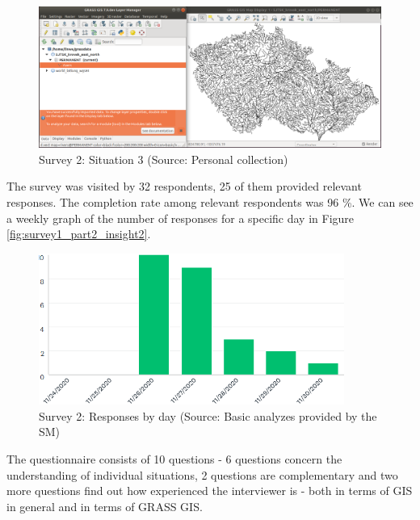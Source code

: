 \documentclass[a4paper,10pt,twoside]{article}
\begin{document}
\vspace{0.3cm}
\begin{figure}[hbt!] 
\begin{center}
\includegraphics[width=17cm]{../pictures/grass_infobar_3.png} 
\caption[Survey 2: Situation 3]{Survey 2: Situation 3 (Source: Personal collection)}
\label{fig:grass_infobar_3}
\end{center}
\end{figure}

\noindent The survey was visited by 32 respondents, 25 of them
provided relevant responses. The completion rate among relevant
respondents was 96 \%. We can see a weekly graph of the number of
responses for a specific day in Figure
\ref{fig:survey1_part2_insight2}.

\vspace{0.3cm}
\begin{figure}[hbt!] 
\begin{center}
\includegraphics[width=10cm]{../surveys/analyzed_data/survey2_insight2.png} 
\caption[Survey 2: Responses by day]{Survey 2: Responses by day (Source: Basic analyzes provided by the SM)}
\label{fig:survey2_insight2}
\end{center}
\end{figure}

\noindent The questionnaire consists of 10 questions - 6 questions
concern the understanding of individual situations, 2 questions are
complementary and two more questions find out how experienced the
interviewer is - both in terms of GIS in general and in terms of GRASS
GIS.
\end{document}
